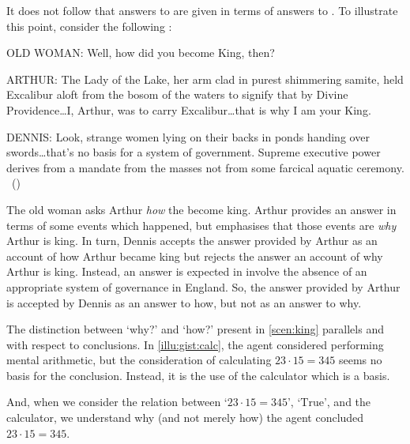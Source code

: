 \begin{note}
  It does not follow that answers to \qWhy{} are given in terms of answers to \qHow{}.
  To illustrate this point, consider the following \scen{}:

  \begin{scenario}[England AD 932]
    \label{scen:king}
    \vspace{-\baselineskip}
    \begin{screenplay}
    \item[OLD WOMAN:]
      Well, how did you become King, then?
    \item[ARTHUR:]
      The Lady of the Lake, her arm clad in purest shimmering samite, held Excalibur aloft from the bosom of the waters to signify that by Divine Providence\space\dots\space I, Arthur, was to carry Excalibur\dots\space that is why I am your King.
    \item[DENNIS:]
      Look, strange women lying on their backs in ponds handing over swords\space\dots\space that's no basis for a system of government.
      Supreme executive power derives from a mandate from the masses not from some farcical aquatic ceremony.%
      \mbox{ }\hfill\mbox{(\cite[8--9]{Cleese:1974aa})}
    \end{screenplay}
    \vspace{-\baselineskip}
  \end{scenario}

  The old woman asks Arthur \emph{how} the become king.
  Arthur provides an answer in terms of some events which happened, but emphasises that those events are \emph{why} Arthur is king.
  In turn, Dennis accepts the answer provided by Arthur as an account of how Arthur became king but rejects the answer an account of why Arthur is king.
  Instead, an answer is expected in involve the absence of an appropriate system of governance in England.
  So, the answer provided by Arthur is accepted by Dennis as an answer to how, but not as an answer to why.
\end{note}

\begin{note}
  The distinction between `why?' and `how?' present in \autoref{scen:king} parallels \qWhy{} and \qHow{} with respect to conclusions.
  In \autoref{illu:gist:calc}, the agent considered performing mental arithmetic, but the consideration of calculating \(23 \cdot 15 = 345\) seems no basis for the conclusion.
  Instead, it is the use of the calculator which is a basis.

  And, when we consider the relation between `\(23 \cdot 15 = 345\)', `\(\text{True}\)', and the calculator, we understand why (and not merely how) the agent concluded \(23 \cdot 15 = 345\).
\end{note}

